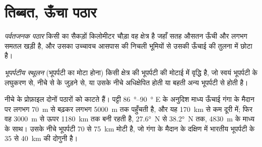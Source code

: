 \section{तिब्बत, ऊँचा पठार}\label{sec:b2:himalaya-andes:tibet}

\begin{definition}[पर्वतजनक पठार]\label{def:b2:himalaya-andes:plateau}
\emph{पर्वतजनक पठार} किसी  का सैकड़ों
किलोमीटर चौड़ा वह क्षेत्र है जहाँ सतह औसतन ऊँची और लगभग समतल खड़ी है, और उसका उच्चावच
आसपास की निचली भूमियों से उसकी ऊँचाई की तुलना में छोटा है।
\end{definition}

\begin{definition}[भूपर्पटीय स्थूलन]\label{def:b2:himalaya-andes:thickening}
\emph{भूपर्पटीय स्थूलन} (भूपर्पटी का मोटा होना) किसी क्षेत्र की भूपर्पटी की मोटाई में
वृद्धि है, जो स्वयं भूपर्पटी के लघुकरण से, नीचे से  के जुड़ने से, या
उसके नीचे अधिक्षेपित होती या बहती अन्य भूपर्पटी से होती है।
\end{definition}

नीचे के प्रोफ़ाइल दोनों पठारों को काटते हैं। पट्टी \qtyrange{86}{90}{\degree} E के अनुदिश माध्य
ऊँचाई गंगा के मैदान पर लगभग \qty{70}{m} से बढ़कर लगभग \qty{5000}{m} तक पहुँचती है, और यह
\qty{170}{km} से कम दूरी में; फिर वह \qty{3000}{m} से ऊपर \qty{1180}{km} तक बनी रहती है, \ang{27.6}~N से
\ang{38.2}~N तक, \qty{4830}{m} के माध्य के साथ। उसके नीचे भूपर्पटी 70 से \qty{75}{km} मोटी है,
जो गंगा के मैदान के दक्षिण में भारतीय भूपर्पटी के 35 से \qty{40}{km} की दोगुनी है।

